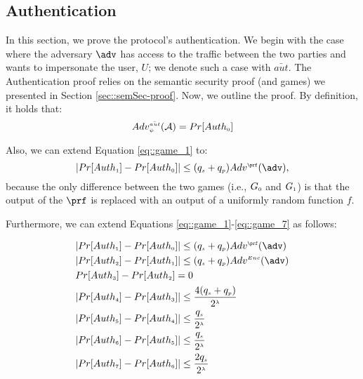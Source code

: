 


\subsection{Authentication}

In this section, we prove the protocol's authentication. We begin with the case where the adversary $\adv$ has access to the traffic between the two parties and wants to impersonate the user, $U$; we denote such a case with $\bar {aut}$. The Authentication proof relies on the semantic security proof (and games) we presented in Section \ref{sec::semSec-proof}.  Now, we outline the proof.  By definition, it holds that:
%
 \begin{equation}\label{eq::adv-ake}
Adv_{\scriptscriptstyle \psi}^{\scriptscriptstyle \bar {aut}}(\mathcal{A})=Pr[Auth_{\scriptscriptstyle  0}]
\end{equation}


Also, we can extend Equation \ref{eq::game_1} to:
%
\begin{equation*}
|Pr[Auth_{\sss  1}]-Pr[Auth_{\sss  0}]| \leq (q_{\sss s}+q_{\sss p})Adv^{\sss\prf}(\adv),
\end{equation*}
%
 because the only difference between the two games (i.e., $G_{\scriptscriptstyle  0}$ and $G_{\scriptscriptstyle  1}$) is that the output of the $\prf$ is replaced with an output of a uniformly random function $f$. 
 
 
 Furthermore, we can extend Equations \ref{eq::game_1}-\ref{eq::game_7} as follows: 
 
 
 \begin{equation*}
 \begin{split}
  &  |Pr[Auth_{\sss  1}]-Pr[Auth_{\sss  0}]| \leq (q_{\sss s}+q_{\sss p}) Adv^{\sss \prf}(\adv) \\ 
 &  |Pr[Auth_{\sss  2}]-Pr[Auth_{\sss 1}]| \leq (q_{\sss s}+q_{\sss p}) Adv^{\sss Enc}(\adv) \\ 
 & Pr[Auth_{\sss  3}]-Pr[Auth_{\sss  2}]=0\\
 & |Pr[Auth_{\sss  4}]-Pr[Auth_{\sss  3}]|\leq \frac{4(q_{\sss  s}+q_{\sss  p})}{2^{\sss \lambda}}\\
 & |Pr[Auth_{\sss  5}]-Pr[Auth_{\sss  4}]|\leq \frac{q_{\sss  s}}{2^{\sss \lambda}}\\
 & |Pr[Auth_{\sss  6}]-Pr[Auth_{\sss  5}]|\leq \frac{q_{\sss  s}}{2^{\sss \lambda}}\\
 & |Pr[Auth_{\sss  7}]-Pr[Auth_{\sss  6}]|\leq \frac{2q_{\sss  s}}{2^{\sss \lambda}}
\end{split}
\end{equation*}

